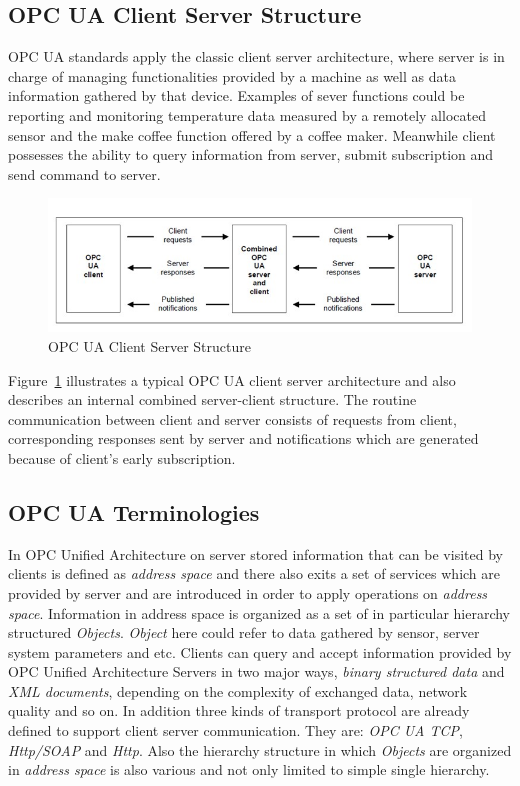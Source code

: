 \subsection{OPC UA Client Server Structure}
OPC UA standards apply the classic client server architecture, where server is in charge of managing functionalities provided by a machine as well as data information gathered by that device. Examples of sever functions could be reporting and monitoring temperature data measured by  a remotely allocated sensor and the make coffee function offered by a coffee maker. Meanwhile client possesses the ability to query information from server, submit subscription and send command to server.

\begin{figure}[!htbp]
	\centering
	\includegraphics[width=1.00\textwidth]{cs.jpg}
		\caption{OPC UA Client Server Structure\cite{O1}}
	\label{fig:cs}
\end{figure}
Figure~\ref{fig:cs} illustrates a typical OPC UA client server architecture and also describes an internal combined server-client structure. The routine communication between client and server consists of requests from client, corresponding responses sent by server and notifications which are generated because of client's early subscription.

\subsection{OPC UA Terminologies}
In OPC Unified Architecture on server stored information that can be visited by clients is defined as \emph{address space}\cite{O3} and there also exits a set of services\cite{O4} which are provided by server and are introduced in order to apply operations on \emph{address space}. Information in address space is organized as a set of in particular hierarchy structured \emph{Objects}. \emph{Object} here could refer to data gathered by sensor, server system parameters and etc. Clients can query and accept information provided by OPC Unified Architecture Servers in two major ways, \emph{binary structured data} and \emph{XML documents}, depending on the complexity of exchanged data, network quality and so on. In addition three kinds of transport protocol are already defined to support client server communication. They are: \emph{OPC UA TCP}, \emph{Http/SOAP} and \emph{Http}. Also the hierarchy structure in which \emph{Objects} are organized in \emph{address space} is also various and not only limited to simple single hierarchy.   

